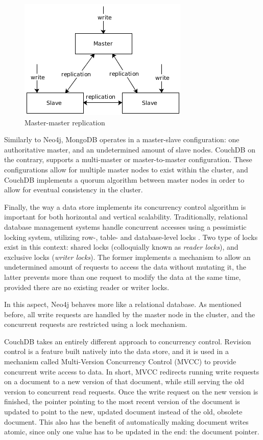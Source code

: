 \begin{figure}
  \centering
  \includegraphics[width=.4\textwidth]{img/replication-master-master.png}
  \caption{Master-master replication}
  \label{fig:replication-master-master}
\end{figure}

Similarly to Neo4j, MongoDB operates in a master-slave configuration: one authoritative master, and an undetermined amount of slave nodes.
CouchDB on the contrary, supports a multi-master or master-to-master configuration.
These configurations allow for multiple master nodes to exist within the cluster, and CouchDB implements a quorum algorithm between master nodes in order to allow for eventual consistency in the cluster.

Finally, the way a data store implements its concurrency control algorithm is important for both horizontal and vertical scalability.
Traditionally, relational database management systems handle concurrent accesses using a pessimistic locking system, utilizing row-, table- and database-level locks \autocite{Bernstein1987}.
Two type of locks exist in this context: shared locks (colloquially known as \textit{reader locks}), and exclusive locks (\textit{writer locks}).
The former implements a mechanism to allow an undetermined amount of requests to access the data without mutating it, the latter prevents more than one request to modify the data at the same time, provided there are no existing reader or writer locks.

In this aspect, Neo4j behaves more like a relational database.
As mentioned before, all write requests are handled by the master node in the cluster, and the concurrent requests are restricted using a lock mechanism.

CouchDB takes an entirely different approach to concurrency control.
Revision control is a feature built natively into the data store, and it is used in a mechanism called Multi-Version Concurrency Control (MVCC) to provide concurrent write access to data.
In short, MVCC redirects running write requests on a document to a new version of that document, while still serving the old version to concurrent read requests.
Once the write request on the new version is finished, the pointer pointing to the most recent version of the document is updated to point to the new, updated document instead of the old, obsolete document.
This also has the benefit of automatically making document writes atomic, since only one value has to be updated in the end: the document pointer.

